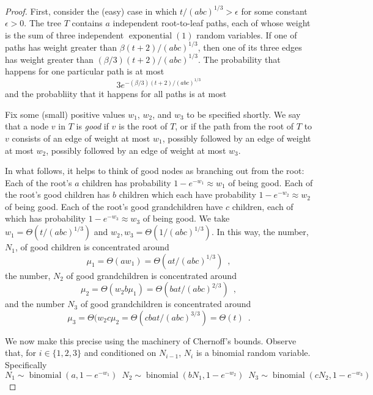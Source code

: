 \documentclass[a4paper,UKenglish]{lipics-v2016}
\DeclareMathOperator{\exponential}{exponential}
\DeclareMathOperator{\binomial}{binomial}
\begin{document}
\begin{proof}
  First, consider the (easy) case in which $t/(abc)^{1/3}>\epsilon$
  for some constant $\epsilon >0$. The tree $T$ contains $a$ independent
  root-to-leaf paths, each of whose weight is the sum of three independent
  $\exponential(1)$ random variables.  If one of paths has weight greater than
  $\beta(t+2)/(abc)^{1/3}$, then one of its three edges has weight greater than 
  $(\beta/3)(t+2)/(abc)^{1/3}$.  The probability that happens for one particular path is at most
  \[
      3e^{-(\beta/3)(t+2)/(abc)^{1/3}}   
  \]
  and the probabliity that it happens for all paths is at most

  Fix some (small) positive values $w_1$, $w_2$, and $w_3$ to be specified
  shortly.  We say that a node $v$ in $T$ is \emph{good} if $v$ is the
  root of $T$, or if the path from the root of $T$ to $v$ consists of an
  edge of weight at most $w_1$, possibly followed by an edge of weight
  at most $w_2$, possibly followed by an edge of weight at most $w_3$.

  In what follows, it helps to think of good nodes as branching
  out from the root: Each of the root's $a$ children has probability
  $1-e^{-w_1}\approx w_1$ of being good.  Each of the root's good children
  has $b$ children which each have probability $1-e^{-w_2}\approx w_2$
  of being good. Each of the root's good grandchildren have $c$ children,
  each of which has probability $1-e^{-w_3}\approx w_3$ of being good.
  We take $w_1=\Theta(t/(abc)^{1/3})$ and $w_2,w_3=\Theta(1/(abc)^{1/3})$. In this way, the number, $N_1$, of good children is concentrated around
  \[  \mu_1 = \Theta(aw_1) = \Theta(at/(abc)^{1/3}) \enspace , \]
  the number, $N_2$ of good grandchildren is concentrated around 
  \[  \mu_2 = \Theta(w_2b\mu_1) = \Theta(bat/(abc)^{2/3}) \enspace , \]
  and the number $N_3$ of good grandchildren is concentrated around
  \[  \mu_3 = \Theta(w_2c\mu_2=\Theta(cbat/(abc)^{3/3}) = \Theta(t) \enspace . \]

  We now make this precise using the machinery of Chernoff's bounds.
  Observe that, for $i\in\{1,2,3\}$ and conditioned on
  $N_{i-1}$, $N_i$ is a binomial random variable. Specifically
  \[
     N_1 \sim \binomial(a,1-e^{-w_1}) \enspace 
     N_2 \sim \binomial(bN_1,1-e^{-w_2}) \enspace
     N_3 \sim \binomial(cN_2,1-e^{-w_3})
  \]


\end{proof}
\end{document}
